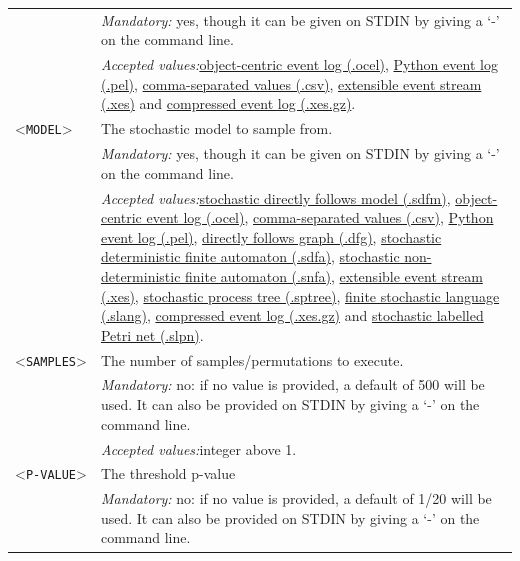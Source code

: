 {\begin{tabularx}{\linewidth}{lX}
&\textit{Mandatory:} \quad yes, though it can be given on STDIN by giving a `-' on the command line.\\
&\textit{Accepted values:}\quad \hyperref[filehandler:object-centric event log]{object-centric event log (.ocel)}, \hyperref[filehandler:Python event log]{Python event log (.pel)}, \hyperref[filehandler:comma-separated values]{comma-separated values (.csv)}, \hyperref[filehandler:extensible event stream]{extensible event stream (.xes)} and \hyperref[filehandler:compressed event log]{compressed event log (.xes.gz)}.\\
<\texttt{MODEL}>&The stochastic model to sample from.\\
&\textit{Mandatory:} \quad yes, though it can be given on STDIN by giving a `-' on the command line.\\
&\textit{Accepted values:}\quad \hyperref[filehandler:stochastic directly follows model]{stochastic directly follows model (.sdfm)}, \hyperref[filehandler:object-centric event log]{object-centric event log (.ocel)}, \hyperref[filehandler:comma-separated values]{comma-separated values (.csv)}, \hyperref[filehandler:Python event log]{Python event log (.pel)}, \hyperref[filehandler:directly follows graph]{directly follows graph (.dfg)}, \hyperref[filehandler:stochastic deterministic finite automaton]{stochastic deterministic finite automaton (.sdfa)}, \hyperref[filehandler:stochastic non-deterministic finite automaton]{stochastic non-deterministic finite automaton (.snfa)}, \hyperref[filehandler:extensible event stream]{extensible event stream (.xes)}, \hyperref[filehandler:stochastic process tree]{stochastic process tree (.sptree)}, \hyperref[filehandler:finite stochastic language]{finite stochastic language (.slang)}, \hyperref[filehandler:compressed event log]{compressed event log (.xes.gz)} and \hyperref[filehandler:stochastic labelled Petri net]{stochastic labelled Petri net (.slpn)}.\\
<\texttt{SAMPLES}>&The number of samples/permutations to execute.\\
&\textit{Mandatory:} \quad no: if no value is provided, a default of 500 will be used. It can also be provided on STDIN by giving a `-' on the command line.\\
&\textit{Accepted values:}\quad integer above 1.\\
<\texttt{P-VALUE}>&The threshold p-value\\
&\textit{Mandatory:} \quad no: if no value is provided, a default of 1/20 will be used. It can also be provided on STDIN by giving a `-' on the command line.\\

\end{tabularx}}
